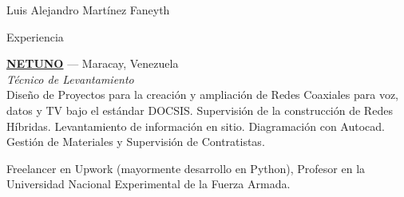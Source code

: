 \documentclass[11pt,letterpaper]{article}
\begin{document}
\begin{cv}{Luis Alejandro Mart\'inez Faneyth}
\begin{cvlist}{Experiencia}
{	\parbox[t]{\linewidth}{
		\textbf{\href{https://www.netuno.net}{NETUNO}} --- Maracay, Venezuela\\
		\textit{T\'ecnico de Levantamiento}\\
		\footnotesize{Dise\~no de Proyectos para la creaci\'on y ampliaci\'on de Redes Coaxiales para voz, datos y TV bajo el est\'andar DOCSIS. Supervisi\'on de la construcci\'on de Redes H\'ibridas. Levantamiento de informaci\'on en sitio. Diagramaci\'on con Autocad. Gesti\'on de Materiales y Supervisi\'on de Contratistas.}
	}
}
\item[{\parbox[t]{6em}{\textit{\large{Otra\\experiencia}}}}]{
	\parbox[t]{\linewidth}{
		\footnotesize{Freelancer en Upwork (mayormente desarrollo en Python), Profesor en la Universidad Nacional Experimental de la Fuerza Armada.}
	}
}
\end{cvlist}


\end{cv}
\end{document}
